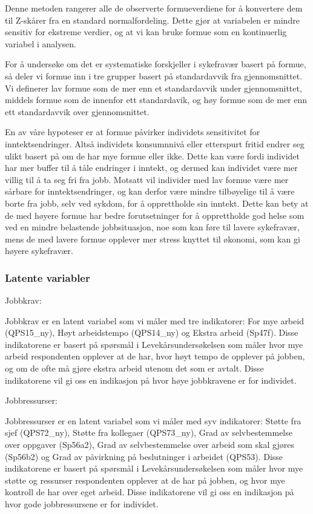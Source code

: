 \documentclass[
  12pt,
  a4paper,
  DIV=11,
  numbers=noendperiod]{scrartcl}
\begin{document}
Denne metoden rangerer alle de observerte formueverdiene for å
konvertere dem til Z-skårer fra en standard normalfordeling. Dette gjør
at variabelen er mindre sensitiv for ekstreme verdier, og at vi kan
bruke formue som en kontinuerlig variabel i analysen.

For å undersøke om det er systematiske forskjeller i sykefravær basert
på formue, så deler vi formue inn i tre grupper basert på standardavvik
fra gjennomsnittet. Vi definerer lav formue som de mer enn et
standardavvik under gjennomsnittet, middels formue som de innenfor ett
standardavik, og høy formue som de mer enn ett standardavvik over
gjennomsnittet.

En av våre hypoteser er at formue påvirker individets sensitivitet for
inntektsendringer. Altså individets konsumnnivå eller etterspurt fritid
endrer seg ulikt basert på om de har mye formue eller ikke. Dette kan
være fordi individet har mer buffer til å tåle endringer i inntekt, og
dermed kan individet være mer villig til å ta seg fri fra jobb. Motsatt
vil individer med lav formue være mer sårbare for inntektsendringer, og
kan derfor være mindre tilbøyelige til å være borte fra jobb, selv ved
sykdom, for å opprettholde sin inntekt. Dette kan bety at de med høyere
formue har bedre forutsetninger for å opprettholde god helse som ved en
mindre belastende jobbsituasjon, noe som kan føre til lavere sykefravær,
mens de med lavere formue opplever mer stress knyttet til økonomi, som
kan gi høyere sykefravær.

\subsubsection{Latente variabler}\label{latente-variabler}

Jobbkrav:

Jobbkrav er en latent variabel som vi måler med tre indikatorer: For mye
arbeid (QPS15\_ny), Høyt arbeidstempo (QPS14\_ny) og Ekstra arbeid
(Sp47f). Disse indikatorene er basert på spørsmål i
Levekårsundersøkelsen som måler hvor mye arbeid respondenten opplever at
de har, hvor høyt tempo de opplever på jobben, og om de ofte må gjøre
ekstra arbeid utenom det som er avtalt. Disse indikatorene vil gi oss en
indikasjon på hvor høye jobbkravene er for individet.

Jobbressurser:

Jobbressurser er en latent variabel som vi måler med syv indikatorer:
Støtte fra sjef (QPS72\_ny), Støtte fra kollegaer (QPS73\_ny), Grad av
selvbestemmelse over oppgaver (Sp56a2), Grad av selvbestemmelse over
arbeid som skal gjøres (Sp56b2) og Grad av påvirkning på beslutninger i
arbeidet (QPS53). Disse indikatorene er basert på spørsmål i
Levekårsundersøkelsen som måler hvor mye støtte og ressurser
respondenten opplever at de har på jobben, og hvor mye kontroll de har
over eget arbeid. Disse indikatorene vil gi oss en indikasjon på hvor
gode jobbressursene er for individet.
\end{document}
